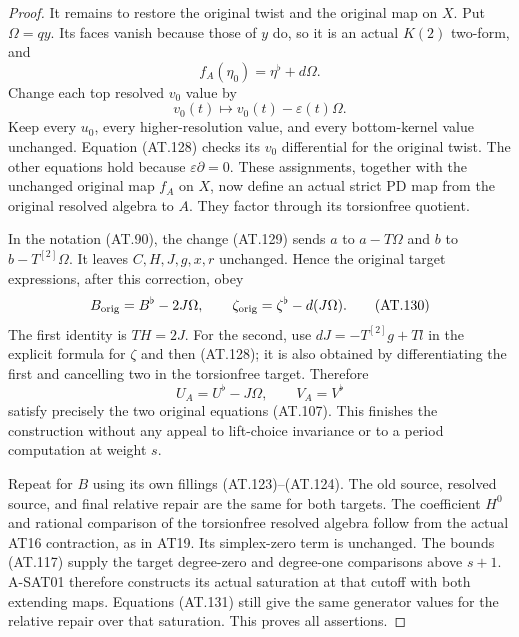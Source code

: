 \begin{proof}
It remains to restore the original twist and the original
map on $X$. Put $\Omega=qy$. Its faces vanish because those
of $y$ do, so it is an actual $K(2)$ two-form, and
\[
                  f_A(\eta_0)=\eta^\flat+d\Omega.
 \tag{AT.128}
\]
Change each top resolved $v_0$ value by
\[
                    v_0(t)\longmapsto
                              v_0(t)-\varepsilon(t)\Omega .
 \tag{AT.129}
\]
Keep every $u_0$, every higher-resolution value, and every
bottom-kernel value unchanged.
Equation (AT.128) checks its $v_0$ differential for the
original twist. The other equations hold because
$\varepsilon\partial=0$.
These assignments, together with the unchanged original
map $f_A$ on $X$, now define an actual strict PD map
from the original resolved algebra to $A$.
They factor through its torsionfree quotient.

In the notation (AT.90), the change (AT.129) sends
$a$ to $a-T\Omega$ and $b$ to $b-T^{[2]}\Omega$.
It leaves $C,H,J,g,x,r$ unchanged. Hence the original
target expressions, after this correction, obey
\[
 B_{\rm orig}=B^\flat-2J\Omega,\qquad
 \zeta_{\rm orig}=\zeta^\flat-d(J\Omega).
 \tag{AT.130}
\]
The first identity is $T H=2J$.
For the second, use $dJ=-T^{[2]}g+Tl$ in the explicit
formula for $\zeta$ and then (AT.128); it is also
obtained by differentiating the first and cancelling
two in the torsionfree target.
Therefore
\[
                   U_A=U^\flat-J\Omega,\qquad
                   V_A=V^\flat
 \tag{AT.131}
\]
satisfy precisely the two original equations (AT.107).
This finishes the construction without any appeal to
lift-choice invariance or to a period computation at
weight $s$.

Repeat for $B$ using its own fillings (AT.123)--(AT.124).
The old source, resolved source, and final relative repair
are the same for both targets.
The coefficient $H^0$ and rational comparison of the
torsionfree resolved algebra follow from the actual
AT16 contraction, as in AT19. Its simplex-zero term is
unchanged. The bounds (AT.117) supply the target degree-zero
and degree-one comparisons above $s+1$.
A-SAT01 therefore constructs its actual saturation at that
cutoff with both extending maps. Equations (AT.131) still
give the same generator values for the relative repair
over that saturation. This proves all assertions.
\end{proof}
